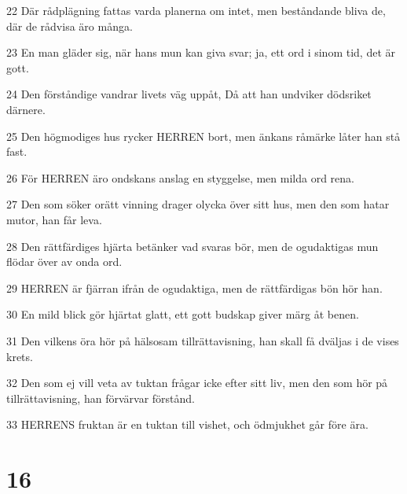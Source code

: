 \par 22 Där rådplägning fattas varda planerna om intet, men beståndande bliva de, där de rådvisa äro många.
\par 23 En man gläder sig, när hans mun kan giva svar; ja, ett ord i sinom tid, det är gott.
\par 24 Den förståndige vandrar livets väg uppåt, Då att han undviker dödsriket därnere.
\par 25 Den högmodiges hus rycker HERREN bort, men änkans råmärke låter han stå fast.
\par 26 För HERREN äro ondskans anslag en styggelse, men milda ord rena.
\par 27 Den som söker orätt vinning drager olycka över sitt hus, men den som hatar mutor, han får leva.
\par 28 Den rättfärdiges hjärta betänker vad svaras bör, men de ogudaktigas mun flödar över av onda ord.
\par 29 HERREN är fjärran ifrån de ogudaktiga, men de rättfärdigas bön hör han.
\par 30 En mild blick gör hjärtat glatt, ett gott budskap giver märg åt benen.
\par 31 Den vilkens öra hör på hälsosam tillrättavisning, han skall få dväljas i de vises krets.
\par 32 Den som ej vill veta av tuktan frågar icke efter sitt liv, men den som hör på tillrättavisning, han förvärvar förstånd.
\par 33 HERRENS fruktan är en tuktan till vishet, och ödmjukhet går före ära.

\chapter{16}

